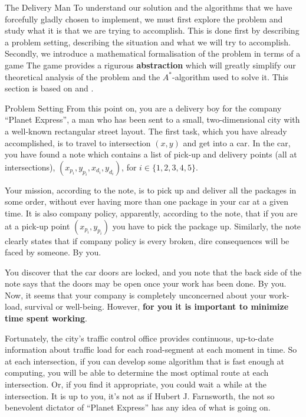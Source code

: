 \begin{section}{The Delivery Man}
  To understand our solution and the algorithms that we have forcefully gladly chosen to implement, we must first explore the problem and study what it is that we are trying to accomplish. This is done first by describing a problem setting, describing the situation and what we will try to accomplish.
  Secondly, we introduce a mathematical formalisation of the problem in terms of a game The game provides a rigurous \textbf{abstraction} which will greatly simplify our theoretical analysis of the problem and the $A^*$-algorithm used to solve it. This section is based on \cite{run} and \cite{lab}.
  
  \begin{subsection}{Problem Setting}
    From this point on, you are a delivery boy for the company ``Planet Express'', a man who has been sent to a small, two-dimensional city with a well-known rectangular street layout. The first task, which you have already accomplished, is to travel to intersection $(x, y)$ and get into a car. In the car, you have found a note which contains a list of pick-up and delivery points (all at intersections), $(x_{p_i}, y_{p_i}, x_{d_i}, y_{d_i})$, for $i\in \{1,2,3,4, 5\}$. 

    Your mission, according to the note, is to pick up and deliver all the packages in some order, without ever having more than one package in your car at a given time. It is also company policy, apparently, according to the note, that if you are at a pick-up point $(x_{p_i}, y_{p_i})$ you have to pick the package up. Similarly, the note clearly states that if company policy is every broken, dire consequences will be faced by someone. By you.
    
    You discover that the car doors are locked, and you note that the back side of the note says that the doors may be open once your work has been done. By you. Now, it seems that your company is completely unconcerned about your work-load, survival or well-being. However, \textbf{for you it is important to minimize time spent working}.

    Fortunately, the city's traffic control office provides continuous, up-to-date information about traffic load for each road-segment at each moment in time. So at each intersection, if you can develop some algorithm that is fast enough at computing, you will be able to determine the most optimal route at each intersection. Or, if you find it appropriate, you could wait a while at the intersection. It is up to you, it's not as if Hubert J. Farnsworth, the not so benevolent dictator of ``Planet Express'' has any idea of what is going on.
  \end{subsection}


\end{section}
